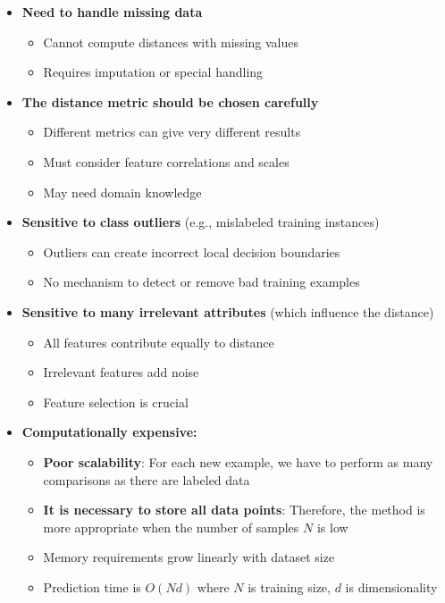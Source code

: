 \documentclass[11pt,a4paper]{article}
\theoremstyle{definition}
\theoremstyle{plain}
\theoremstyle{remark}
\begin{document}
\begin{itemize}
    \item \textbf{Need to handle missing data}
    \begin{itemize}
        \item Cannot compute distances with missing values
        \item Requires imputation or special handling
    \end{itemize}
    
    \item \textbf{The distance metric should be chosen carefully}
    \begin{itemize}
        \item Different metrics can give very different results
        \item Must consider feature correlations and scales
        \item May need domain knowledge
    \end{itemize}
    
    \item \textbf{Sensitive to class outliers} (e.g., mislabeled training instances)
    \begin{itemize}
        \item Outliers can create incorrect local decision boundaries
        \item No mechanism to detect or remove bad training examples
    \end{itemize}
    
    \item \textbf{Sensitive to many irrelevant attributes} (which influence the distance)
    \begin{itemize}
        \item All features contribute equally to distance
        \item Irrelevant features add noise
        \item Feature selection is crucial
    \end{itemize}
    
    \item \textbf{Computationally expensive:}
    \begin{itemize}
        \item \textbf{Poor scalability}: For each new example, we have to perform as many comparisons as there are labeled data
        
        \item \textbf{It is necessary to store all data points}: Therefore, the method is more appropriate when the number of samples $N$ is low
        
        \item Memory requirements grow linearly with dataset size
        \item Prediction time is $O(Nd)$ where $N$ is training size, $d$ is dimensionality
    \end{itemize}
\end{itemize}
\end{document}
